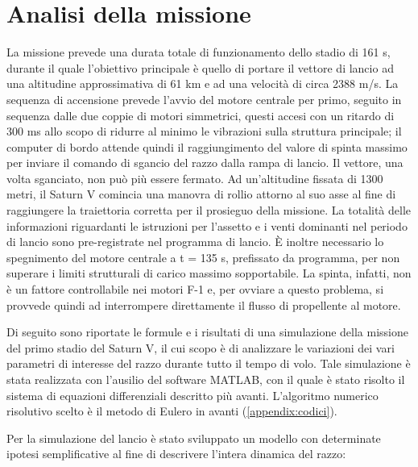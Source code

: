\section{Analisi della missione}
\label{sec:analisi missione}

La missione prevede una durata totale di funzionamento dello stadio di 161 s, durante il quale l’obiettivo principale è quello di portare il vettore di lancio ad una altitudine approssimativa di 61 km e ad una velocità di circa 2388 m/s.
La sequenza di accensione prevede l’avvio del motore centrale per primo, seguito in sequenza dalle due coppie di motori simmetrici, questi accesi con un ritardo di 300 ms allo scopo di ridurre al minimo le vibrazioni sulla struttura principale; il computer di bordo attende quindi il raggiungimento del valore di spinta massimo per inviare il comando di sgancio del razzo dalla rampa di lancio. Il vettore, una volta sganciato, non può più essere fermato.
Ad un’altitudine fissata di 1300 metri, il Saturn V comincia una manovra di rollio attorno al suo asse al fine di raggiungere la traiettoria corretta per il prosieguo della missione. La totalità delle informazioni riguardanti le istruzioni per l’assetto e i venti dominanti nel periodo di lancio sono pre-registrate nel programma di lancio.
È inoltre necessario lo spegnimento del motore centrale a t = 135 s, prefissato da programma, per non superare i limiti strutturali di carico massimo sopportabile. La spinta, infatti, non è un fattore controllabile nei motori F-1 e, per ovviare a questo problema, si provvede quindi ad interrompere direttamente il flusso di propellente al motore. \cite{flight_manual} \cite{launch_report}

Di seguito sono riportate le formule e i risultati di una simulazione della missione del primo stadio del Saturn V, il cui scopo è di analizzare le variazioni dei vari parametri di interesse del razzo durante tutto il tempo di volo. Tale simulazione è stata realizzata con l'ausilio del software MATLAB, con il quale è stato risolto il sistema di equazioni differenziali descritto più avanti. L'algoritmo numerico risolutivo scelto è il metodo di Eulero in avanti (\autoref{appendix:codici}).

Per la simulazione del lancio è stato sviluppato un modello con determinate ipotesi semplificative al fine di descrivere l’intera dinamica del razzo:

